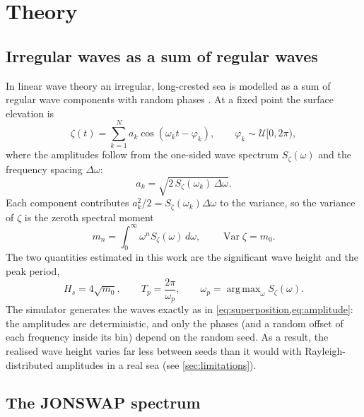 \documentclass[11pt,a4paper]{article}
\newcommand{\Hs}{H_{s}}
\newcommand{\Tp}{T_{p}}
\DeclareMathOperator*{\argmax}{arg\,max}
\begin{document}
\section{Theory}
\label{sec:theory}

\subsection{Irregular waves as a sum of regular waves}
\label{sec:waves}

In linear wave theory an irregular, long-crested sea is modelled as a sum of regular wave
components with random phases \citep{faltinsen1990,sorensen2013,fossen2021}. At a fixed point
the surface elevation is
\begin{equation}
  \zeta(t) = \sum_{k=1}^{N} a_k \cos(\omega_k t - \varphi_k),
  \qquad \varphi_k \sim \mathcal{U}[0, 2\pi),
  \label{eq:superposition}
\end{equation}
where the amplitudes follow from the one-sided wave spectrum $S_\zeta(\omega)$ and the
frequency spacing $\Delta\omega$:
\begin{equation}
  a_k = \sqrt{2\, S_\zeta(\omega_k)\, \Delta\omega}.
  \label{eq:amplitude}
\end{equation}
Each component contributes $a_k^2/2 = S_\zeta(\omega_k)\Delta\omega$ to the variance, so the
variance of $\zeta$ is the zeroth spectral moment
\begin{equation}
  m_n = \int_0^\infty \omega^n S_\zeta(\omega)\, d\omega,
  \qquad
  \operatorname{Var}\zeta = m_0 .
\end{equation}
The two quantities estimated in this work are the significant wave height and the peak period,
\begin{equation}
  \Hs = 4\sqrt{m_0},
  \qquad
  \Tp = \frac{2\pi}{\omega_p},
  \qquad
  \omega_p = \argmax_\omega S_\zeta(\omega).
  \label{eq:hs_tp}
\end{equation}
The simulator generates the waves exactly as in
\cref{eq:superposition,eq:amplitude}: the amplitudes are deterministic, and only the phases (and
a random offset of each frequency inside its bin) depend on the random seed. As a result, the
realised wave height varies far less between seeds than it would with Rayleigh-distributed
amplitudes in a real sea (see \cref{sec:limitations}).

\subsection{The JONSWAP spectrum}
\label{sec:jonswap}
\end{document}
